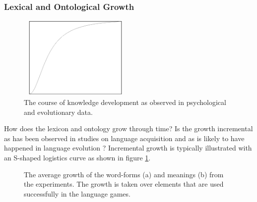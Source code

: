 \subsubsection{Lexical and Ontological Growth}

\begin{figure}
\centerline{\includegraphics[width=5.5cm,height=4cm]{basic/growth.eps}}
\caption{The course of knowledge development as observed in psychological and evolutionary data.}
\label{f:st:growth}
\end{figure}

How does the lexicon and ontology grow through time? Is the growth incremental as has been observed in studies on language acquisition and as is likely to have happened in language evolution \citep{aitchison:1996}? Incremental growth is typically illustrated with an S-shaped logistics curve as shown in figure \ref{f:st:growth}.

\begin{figure}
\centering
{}
\caption{The average growth of the word-forms (a) and meanings (b) from the experiments. The growth is taken over elements that are used successfully in the language games.}
\label{f:st:growthlex}
\end{figure}


